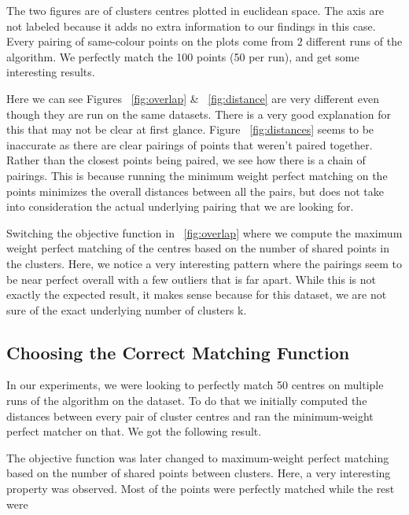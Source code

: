 \documentclass[12pt]{dalthesis}
\begin{document}
The two figures are of clusters centres plotted in euclidean space. The axis are not labeled because it adds no extra information to our findings in this case. Every pairing of same-colour points on the plots come from $2$ different runs of the algorithm. We perfectly match the 100 points (50 per run), and get some interesting results.

Here we can see Figures ~\ref{fig:overlap} \& ~\ref{fig:distance} are very different even though they are run on the same datasets. There is a very good explanation for this that may not be clear at first glance. Figure ~\ref{fig:distances} seems to be inaccurate as there are clear pairings of points that weren't paired together. Rather than the closest points being paired, we see how there is a chain of pairings. This is because running the minimum weight perfect matching on the points minimizes the overall distances between all the pairs, but does not take into consideration the actual underlying pairing that we are looking for.

Switching the objective function in ~\ref{fig:overlap} where we compute the maximum weight perfect matching of the centres based on the number of shared points in the clusters. Here, we notice a very interesting pattern where the pairings seem to be near perfect overall with a few outliers that is far apart. While this is not exactly the expected result, it makes sense because for this dataset, we are not sure of the exact underlying number of clusters k. 



\subsection{Choosing the Correct Matching Function}
In our experiments, we were looking to perfectly match 50 centres on multiple runs of the algorithm on the 
 dataset. To do that we initially computed the distances between every pair of cluster centres and ran the minimum-weight perfect matcher on that. We got the following result.

The objective function was later changed to maximum-weight perfect matching based on the number of shared points between clusters. Here, a very interesting property was observed. Most of the points were perfectly matched while the rest were 
\end{document}
